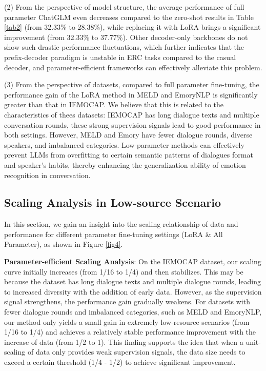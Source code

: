 \documentclass[conference]{IEEEtran}
\begin{document}
(2) From the perspective of model structure, the average performance of full parameter ChatGLM even decreases compared to the zero-shot results in Table \ref{tab2} (from 32.33\% to 28.38\%), while replacing it with LoRA brings a significant improvement (from 32.33\% to 37.77\%). Other decoder-only backbones do not show such drastic performance fluctuations, which further indicates that the prefix-decoder paradigm is unstable in ERC tasks compared to the casual decoder, and parameter-efficient frameworks can effectively alleviate this problem.

(3) From the perspective of datasets, compared to full parameter fine-tuning, the performance gain of the LoRA method in MELD and EmoryNLP is significantly greater than that in IEMOCAP. We believe that this is related to the characteristics of thees datasets: IEMOCAP has long dialogue texts and multiple conversation rounds, these strong supervision signals lead to good performance in both settings. However, MELD and Emory have fewer dialogue rounds, diverse speakers, and imbalanced categories. Low-parameter methods can effectively prevent LLMs from overfitting to certain semantic patterns of dialogues format and speaker's habits, thereby enhancing the generalization ability of emotion recognition in conversation.










\subsection{Scaling Analysis in Low-source Scenario}








In this section, we gain an insight into the scaling relationship of data and performance for different parameter fine-tuning settings (LoRA \& All Parameter), as shown in Figure \ref{fig4}.



\textbf{Parameter-efficient Scaling Analysis}: On the IEMOCAP dataset, our scaling curve initially increases (from 1/16 to 1/4) and then stabilizes. This may be because the dataset has long dialogue texts and multiple dialogue rounds, leading to increased diversity with the addition of early data. However, as the supervision signal strengthens, the performance gain gradually weakens. For datasets with fewer dialogue rounds and imbalanced categories, such as MELD and EmoryNLP, our method only yields a small gain in extremely low-resource scenarios (from 1/16 to 1/4) and achieves a relatively stable performance improvement with the increase of data (from 1/2 to 1). This finding supports the idea that when a unit-scaling of data only provides weak supervision signals, the data size needs to exceed a certain threshold (1/4 - 1/2) to achieve significant improvement. 
\end{document}
